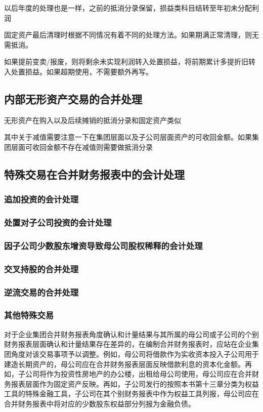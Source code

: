 \documentclass[UTF8,12pt]{ctexart}
\numberwithin{equation}{section} %
\numberwithin{figure}{section}
\numberwithin{table}{section}
\begin{document}
	以后年度的处理也是一样，之前的抵消分录保留，损益类科目结转至年初未分配利润
	
	固定资产最后清理时根据不同情况有着不同的处理方法。如果期满正常清理，则无需抵消。
	
	如果提前变卖/报废，则将剩余未实现利润转入处置损益，将前期累计多提折旧转入处置损益。如果超期使用，不需要额外再写。
	
	\subsection{内部无形资产交易的合并处理}
	无形资产在购入以及后续摊销的抵消分录和固定资产类似
	
	其中关于减值需要注意一下在集团层面以及子公司层面资产的可收回金额。如果集团层面可收回金额不存在减值则需要做抵消分录
	
	\subsection{特殊交易在合并财务报表中的会计处理}
	\subsubsection{追加投资的会计处理}
	
	\subsubsection{处置对子公司投资的会计处理}
	
	\subsubsection{因子公司少数股东增资导致母公司股权稀释的会计处理}
	
	\subsubsection{交叉持股的合并处理}
	
	\subsubsection{逆流交易的合并处理}
	
	\subsubsection{其他特殊交易}
	对于企业集团合并财务报表角度确认和计量结果与其所属的母公司或子公司的个别财务报表层面确认和计量结果存在差异的，在编制合并财务报表时，应站在企业集团角度对该交易事项予以调整。例如，母公司将借款作为实收资本投入子公司用于建造长期资产的，母公司应在合并财务报表层面反映借款利息的资本化金额。再如，子公司将作为投资性房地产的办公楼，出租给母公司使用，母公司应在合并财务报表层面作为固定资产反映。再如，子公司发行的按照本书第十三章分类为权益工具的特殊金融工具，子公司在其个别财务报表中作为权益工具列报，母公司应在合并财务报表中将对应的少数股东权益部分列报为金融负债。
	
\end{document}
